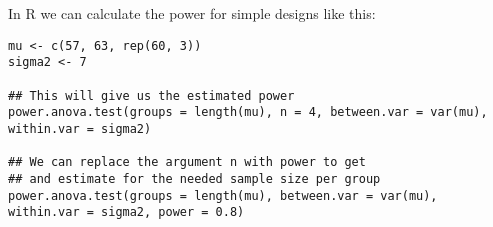 In R we can calculate the power for simple designs like this:
\begin{lstlisting}
mu <- c(57, 63, rep(60, 3)) 
sigma2 <- 7 

## This will give us the estimated power
power.anova.test(groups = length(mu), n = 4, between.var = var(mu), within.var = sigma2)

## We can replace the argument n with power to get 
## and estimate for the needed sample size per group
power.anova.test(groups = length(mu), between.var = var(mu), within.var = sigma2, power = 0.8)
\end{lstlisting}

